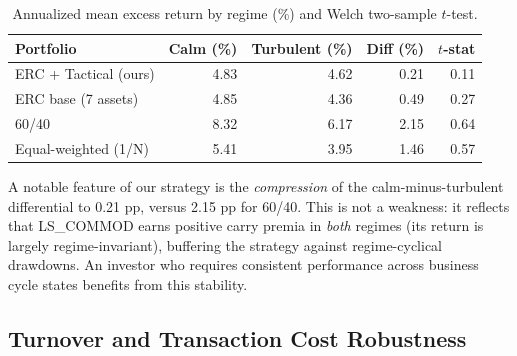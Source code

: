 \documentclass[11pt,letterpaper]{article}
\begin{document}
\begin{table}[H]
\small\centering
\caption{Annualized mean excess return by regime (\%) and Welch two-sample $t$-test.}
\label{tab:regime}
\setlength{\tabcolsep}{6pt}
\begin{tabularx}{\linewidth}{Lrrrr}
\toprule
\textbf{Portfolio} & \textbf{Calm (\%)} & \textbf{Turbulent (\%)} & \textbf{Diff (\%)} & \textbf{$t$-stat} \\
\midrule
{}
ERC + Tactical (ours) & 4.83 & 4.62 & 0.21 & 0.11 \\
ERC base (7 assets)   & 4.85 & 4.36 & 0.49 & 0.27 \\
60/40                 & 8.32 & 6.17 & 2.15 & 0.64 \\
Equal-weighted (1/N)  & 5.41 & 3.95 & 1.46 & 0.57 \\
\bottomrule
\end{tabularx}
\end{table}

A notable feature of our strategy is the \emph{compression} of the calm-minus-turbulent
differential to 0.21 pp, versus 2.15 pp for 60/40. This is not a weakness: it reflects
that LS\_COMMOD earns positive carry premia in \emph{both} regimes (its return is
largely regime-invariant), buffering the strategy against regime-cyclical drawdowns.
An investor who requires consistent performance across business cycle states benefits
from this stability.

\subsection{Turnover and Transaction Cost Robustness}
\end{document}
